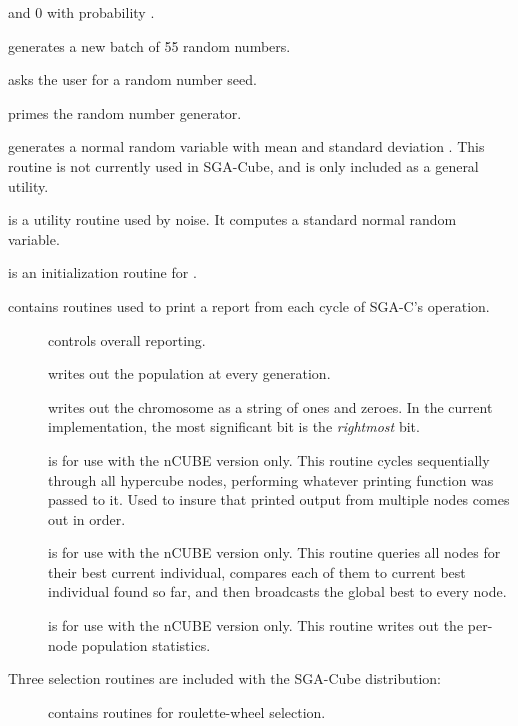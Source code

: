 \begin{description}
\begin{description}
and 0 with probability {}.
\item[{\btt{advance\_random()}}] generates a new batch of 55 random numbers.
\item[{\btt{randomize()}}] asks the user for a random number seed.
\item[{\btt{warmup\_random()}}] primes the random number generator.
\item[{\btt{noise(mu, sigma)}}] generates a normal random variable 
with mean {} and standard
deviation {}.  This routine is not currently used in SGA-Cube, and is only included as a general utility.
\item[{\btt{randomnormaldeviate()}}] is a utility routine used by noise.
It computes a standard normal random variable.
\item[{\btt{initrandomnormaldeviate()}}] is an initialization routine for
{}.
\end{description}
\item[{\btt{report.c}}] contains routines used to print a report from each cycle of SGA-C's operation.
\begin{description}
\item[{}] controls overall reporting.
\item[{}] writes out the population at every generation.
\item[{}] writes out the chromosome as a string of ones and zeroes.
In the current implementation, the most significant bit is the {\it rightmost} bit.
\item[{}] is for use with the nCUBE version only. This routine
cycles sequentially through all hypercube nodes, performing whatever printing
function was passed to it.  Used to insure that printed output from multiple
nodes comes out in order.
\item[{}] is for use with the nCUBE version only. This routine
queries all nodes
for their best current individual, compares each of them to current best individual
found so far, and then broadcasts the global best to every node.
\item[{}] is for use with the nCUBE version only. This routine writes out the
per-node population statistics.
\end{description}
\item Three selection routines are included with the SGA-Cube distribution:
\begin{description}
\item[{}] contains routines for roulette-wheel selection.  

\end{description}
\end{description}
